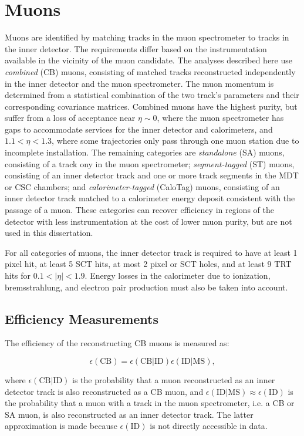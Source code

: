 \section{Muons}\label{sec:event-reconstruction-muons}
Muons are identified by matching tracks in the muon spectrometer to tracks in the inner detector. The requirements differ based on the instrumentation available in the vicinity of the muon candidate. The analyses described here use \emph{combined} (CB) muons, consisting of matched tracks reconstructed independently in the inner detector and the muon spectrometer. The muon momentum is determined from a statistical combination of the two track's parameters and their corresponding covariance matrices. Combined muons have the highest purity, but suffer from a loss of acceptance near $\eta\sim 0$, where the muon spectrometer has gaps to accommodate services for the inner detector and calorimeters, and $1.1<\eta<1.3$, where some trajectories only pass through one muon station due to incomplete installation. The remaining categories are \emph{standalone} (SA) muons, consisting of a track ony in the muon spectrometer; \emph{segment-tagged} (ST) muons, consisting of an inner detector track and one or more track segments in the MDT or CSC chambers; and \emph{calorimeter-tagged} (CaloTag) muons, consisting of an inner detector track matched to a calorimeter energy deposit consistent with the passage of a muon. These categories can recover efficiency in regions of the detector with less instrumentation at the cost of lower muon purity, but are not used in this dissertation. 

For all categories of muons, the inner detector track is required to have at least 1 pixel hit, at least 5 SCT hits, at most 2 pixel or SCT holes, and at least 9 TRT hits for $0.1<|\eta|<1.9$. Energy losses in the calorimeter due to ionization, bremsstrahlung, and electron pair production must also be taken into account. 

\subsection{Efficiency Measurements}\label{sec:reco-muon-efficiency}
The efficiency of the reconstructing CB muons is measured as:

\begin{equation}
	\epsilon(\mathrm{CB}) = \epsilon(\mathrm{CB}|\mathrm{ID}) \epsilon(\mathrm{ID}|\mathrm{MS}),
\end{equation}

where $\epsilon(\mathrm{CB}|\mathrm{ID})$ is the probability that a muon reconstructed as an inner detector track is also reconstructed as a CB muon, and $\epsilon(\mathrm{ID}|\mathrm{MS})\approx \epsilon(\mathrm{ID})$ is the probability that a muon with a track in the muon spectrometer, i.e. a CB or SA muon, is also reconstructed as an inner detector track. The latter approximation is made because $\epsilon(\mathrm{ID})$ is not directly accessible in data. 

